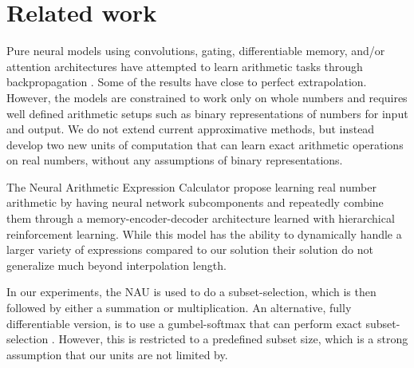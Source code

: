 \section{Related work}
Pure neural models using convolutions, gating, differentiable memory, and/or attention architectures have attempted to learn arithmetic tasks through backpropagation \cite{NeuralGPU,GridLSTM,NTM}.
Some of the results have close to perfect extrapolation. However, the models are constrained to work only on whole numbers and requires well defined arithmetic setups such as binary representations of numbers for input and output.
We do not extend current approximative methods, but instead develop two new units of computation that can learn exact arithmetic operations on real numbers, without any assumptions of binary representations.

The Neural Arithmetic Expression Calculator \cite{NAEC} propose learning real number arithmetic by having neural network subcomponents and repeatedly combine them through a memory-encoder-decoder architecture learned with hierarchical reinforcement learning.
While this model has the ability to dynamically handle a larger variety of expressions compared to our solution their solution do not generalize much beyond interpolation length.

In our experiments, the NAU is used to do a subset-selection, which is then followed by either a summation or multiplication.
An alternative, fully differentiable version, is to use a gumbel-softmax that can perform exact subset-selection \cite{DSS}.
However, this is restricted to a predefined subset size, which is a strong assumption that our units are not limited by.